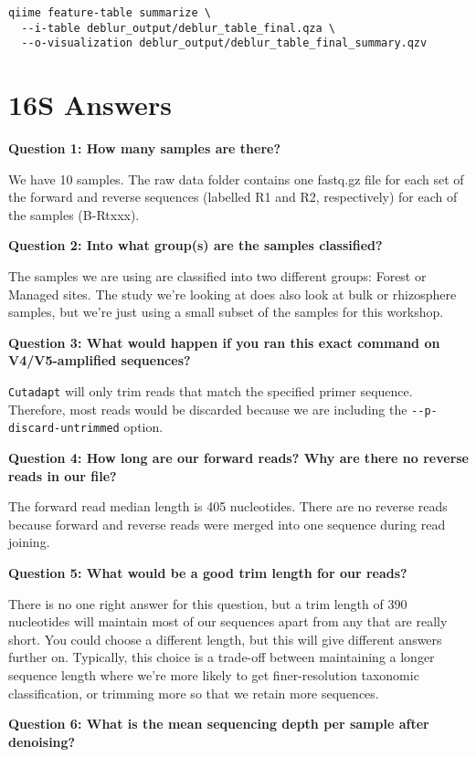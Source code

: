 \documentclass[
]{book}
\begin{document}
\begin{verbatim}
qiime feature-table summarize \
  --i-table deblur_output/deblur_table_final.qza \
  --o-visualization deblur_output/deblur_table_final_summary.qzv
\end{verbatim}

\section{16S Answers}\label{s-answers}

\textbf{Question 1: How many samples are there?}

We have 10 samples. The raw data folder contains one fastq.gz file for each set of the forward and reverse sequences (labelled R1 and R2, respectively) for each of the samples (B-Rtxxx).

\textbf{Question 2: Into what group(s) are the samples classified?}

The samples we are using are classified into two different groups: Forest or Managed sites. The study we're looking at does also look at bulk or rhizosphere samples, but we're just using a small subset of the samples for this workshop.

\textbf{Question 3: What would happen if you ran this exact command on V4/V5-amplified sequences?}

\texttt{Cutadapt} will only trim reads that match the specified primer sequence. Therefore, most reads would be discarded because we are including the \texttt{-\/-p-discard-untrimmed} option.

\textbf{Question 4: How long are our forward reads? Why are there no reverse reads in our file?}

The forward read median length is 405 nucleotides. There are no reverse reads because forward and reverse reads were merged into one sequence during read joining.

\textbf{Question 5: What would be a good trim length for our reads?}

There is no one right answer for this question, but a trim length of 390 nucleotides will maintain most of our sequences apart from any that are really short. You could choose a different length, but this will give different answers further on. Typically, this choice is a trade-off between maintaining a longer sequence length where we're more likely to get finer-resolution taxonomic classification, or trimming more so that we retain more sequences.

\textbf{Question 6: What is the mean sequencing depth per sample after denoising?}
\end{document}
